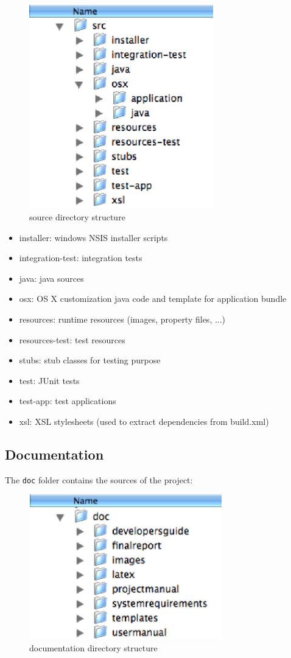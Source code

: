 \documentclass[11pt,a4paper]{article}
\begin{document}
\begin{figure}[H]
 \centering
 \includegraphics[width=8.0cm,height=8.9cm]{../images/developersguide/dir-src.eps}
 \caption{source directory structure}
\end{figure}

\begin{itemize}
 \item installer: windows NSIS installer scripts
 \item integration-test: integration tests
 \item java: java sources
 \item osx: OS X customization java code and template for application bundle
 \item resources: runtime resources (images, property files, ...)
 \item resources-test: test resources
 \item stubs: stub classes for testing purpose
 \item test: JUnit tests
 \item test-app: test applications
 \item xsl: XSL stylesheets (used to extract dependencies from build.xml)
\end{itemize}

\subsection{Documentation}
The \texttt{doc} folder contains the sources of the project:

\begin{figure}[H]
 \centering
 \includegraphics[width=8.4cm,height=6.3cm]{../images/developersguide/dir-doc.eps}
 \caption{documentation directory structure}
\end{figure}
\end{document}
